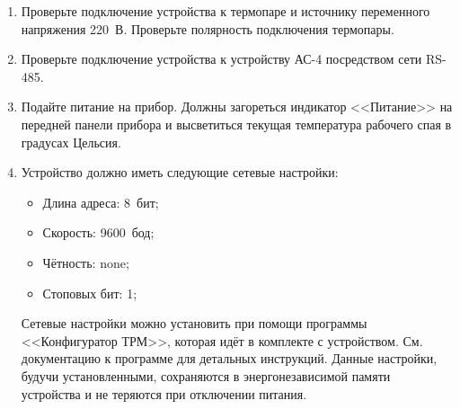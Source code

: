 \begin{enumerate}

\item Проверьте подключение устройства к термопаре и источнику переменного напряжения 220~В. Проверьте полярность подключения термопары.

\item Проверьте подключение устройства к устройству АС-4 посредством сети RS-485.

\item Подайте питание на прибор. Должны загореться индикатор <<Питание>> на передней панели прибора и высветиться текущая температура рабочего спая в градусах Цельсия.

\item Устройство должно иметь следующие сетевые настройки:

\begin{itemize}
\item Длина адреса: 8~бит;
\item Скорость: 9600~бод;
\item Чётность: none;
\item Стоповых бит: 1;
\end{itemize}

Сетевые настройки можно установить при помощи программы <<Конфигуратор ТРМ>>, которая идёт в комплекте с устройством. См. документацию к программе для детальных инструкций. Данные настройки, будучи установленными, сохраняются в энергонезависимой памяти устройства и не теряются при отключении питания.

\end{enumerate}
